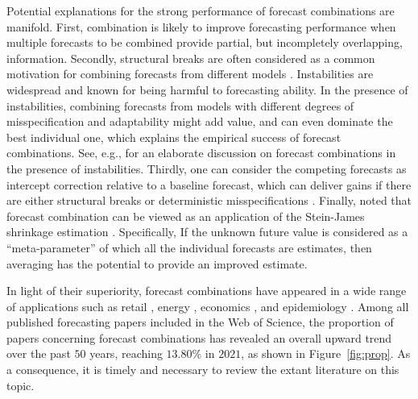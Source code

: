 \documentclass[a4paper,11pt]{article}
\begin{document}
Potential explanations for the strong performance of forecast combinations are manifold. First, combination is likely to improve forecasting performance when multiple forecasts to be combined provide partial, but incompletely overlapping, information. Secondly, structural breaks are often considered as a common motivation for combining forecasts from different models \citep{Timmermann2006-en}. Instabilities are widespread and known for being harmful to forecasting ability. In the presence of instabilities, combining forecasts from models with different degrees of misspecification and adaptability might add value, and can even dominate the best individual one, which explains the empirical success of forecast combinations. See, e.g., \citet{Rossi2013-fi,Rossi2021-fi} for an elaborate discussion on forecast combinations in the presence of instabilities. Thirdly, one can consider the competing forecasts as intercept correction relative to a baseline forecast, which can deliver gains if there are either structural breaks or deterministic misspecifications \citep{Hendry2004-pf}. Finally, \citet{Hendry2004-pf} noted that forecast combination can be viewed as an application of the Stein-James shrinkage estimation \citep{Judge1978-sr}. Specifically, If the unknown future value is considered as a ``meta-parameter'' of which all the individual forecasts are estimates, then averaging has the potential to provide an improved estimate.

In light of their superiority, forecast combinations have appeared in a wide range of applications such as retail \citep{Ma2021-np}, energy \citep{Xie2016-fb}, economics \citep{Aastveit2019-lf}, and epidemiology \citep{Ray2022-co}. Among all published forecasting papers included in the Web of Science, the proportion of papers concerning forecast combinations has revealed an overall upward trend over the past $50$ years, reaching $13.80\%$ in $2021$, as shown in Figure~\ref{fig:prop}. As a consequence, it is timely and necessary to review the extant literature on this topic.
\end{document}
